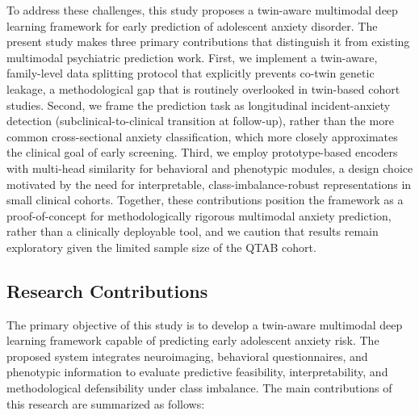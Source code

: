 \documentclass[10pt,letterpaper]{article}
\begin{document}
        To address these challenges, this study proposes a twin-aware multimodal deep learning framework for early prediction of adolescent anxiety disorder. The present study makes three primary contributions that distinguish it from existing multimodal psychiatric prediction work. First, we implement a twin-aware, family-level data splitting protocol that explicitly prevents co-twin genetic leakage, a methodological gap that is routinely overlooked in twin-based cohort studies. Second, we frame the prediction task as longitudinal incident-anxiety detection (subclinical-to-clinical transition at follow-up), rather than the more common cross-sectional anxiety classification, which more closely approximates the clinical goal of early screening. Third, we employ prototype-based encoders with multi-head similarity for behavioral and phenotypic modules, a design choice motivated by the need for interpretable, class-imbalance-robust representations in small clinical cohorts. Together, these contributions position the framework as a proof-of-concept for methodologically rigorous multimodal anxiety prediction, rather than a clinically deployable tool, and we caution that results remain exploratory given the limited sample size of the QTAB cohort.

                \subsection*{Research Contributions}

        The primary objective of this study is to develop a twin-aware
        multimodal deep learning framework capable of predicting early
        adolescent anxiety risk. The proposed system integrates
        neuroimaging, behavioral questionnaires, and phenotypic
        information to evaluate predictive feasibility, interpretability,
        and methodological defensibility under class imbalance. The main contributions of this research
        are summarized as follows:
\end{document}
